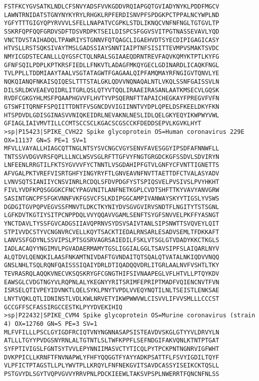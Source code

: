 \begin{lstlisting}
FSTFKCYGVSATKLNDLCFSNVYADSFVVKGDDVRQIAPGQTGVIADYNYKLPDDFMGCV
LAWNTRNIDATSTGNYNYKYRYLRHGKLRPFERDISNVPFSPDGKPCTPPALNCYWPLND
YGFYTTTGIGYQPYRVVVLSFELLNAPATVCGPKLSTDLIKNQCVNFNFNGLTGTGVLTP
SSKRFQPFQQFGRDVSDFTDSVRDPKTSEILDISPCSFGGVSVITPGTNASSEVAVLYQD
VNCTDVSTAIHADQLTPAWRIYSTGNNVFQTQAGCLIGAEHVDTSYECDIPIGAGICASY
HTVSLLRSTSQKSIVAYTMSLGADSSIAYSNNTIAIPTNFSISITTEVMPVSMAKTSVDC
NMYICGDSTECANLLLQYGSFCTQLNRALSGIAAEQDRNTREVFAQVKQMYKTPTLKYFG
GFNFSQILPDPLKPTKRSFIEDLLFNKVTLADAGFMKQYGECLGDINARDLICAQKFNGL
TVLPPLLTDDMIAAYTAALVSGTATAGWTFGAGAALQIPFAMQMAYRFNGIGVTQNVLYE
NQKQIANQFNKAISQIQESLTTTSTALGKLQDVVNQNAQALNTLVKQLSSNFGAISSVLN
DILSRLDKVEAEVQIDRLITGRLQSLQTYVTQQLIRAAEIRASANLAATKMSECVLGQSK
RVDFCGKGYHLMSFPQAAPHGVVFLHVTYVPSQERNFTTAPAICHEGKAYFPREGVFVFN
GTSWFITQRNFFSPQIITTDNTFVSGNCDVVIGIINNTVYDPLQPELDSFKEELDKYFKN
HTSPDVDLGDISGINASVVNIQKEIDRLNEVAKNLNESLIDLQELGKYEQYIKWPWYVWL
GFIAGLIAIVMVTILLCCMTSCCSCLKGACSCGSCCKFDEDDSEPVLKGVKLHYT
>sp|P15423|SPIKE_CVH22 Spike glycoprotein OS=Human coronavirus 229E OX=11137 GN=S PE=1 SV=1
MFVLLVAYALLHIAGCQTTNGLNTSYSVCNGCVGYSENVFAVESGGYIPSDFAFNNWFLL
TNTSSVVDGVVRSFQPLLLNCLWSVSGLRFTTGFVYFNGTGRGDCKGFSSDVLSDVIRYN
LNFEENLRRGTILFKTSYGVVVFYCTNNTLVSGDAHIPFGTVLGNFYCFVNTTIGNETTS
AFVGALPKTVREFVISRTGHFYINGYRYFTLGNVEAVNFNVTTAETTDFCTVALASYADV
LVNVSQTSIANIIYCNSVINRLRCDQLSFDVPDGFYSTSPIQSVELPVSIVSLPVYHKHT
FIVLYVDFKPQSGGGKCFNCYPAGVNITLANFNETKGPLCVDTSHFTTKYVAVYANVGRW
SASINTGNCPFSFGKVNNFVKFGSVCFSLKDIPGGCAMPIVANWAYSKYYTIGSLYVSWS
DGDGITGVPQPVEGVSSFMNVTLDKCTKYNIYDVSGVGVIRVSNDTFLNGITYTSTSGNL
LGFKDVTKGTIYSITPCNPPDQLVVYQQAVVGAMLSENFTSYGFSNVVELPKFFYASNGT
YNCTDAVLTYSSFGVCADGSIIAVQPRNVSYDSVSAIVTANLSIPSNWTTSVQVEYLQIT
STPIVVDCSTYVCNGNVRCVELLKQYTSACKTIEDALRNSARLESADVSEMLTFDKKAFT
LANVSSFGDYNLSSVIPSLPTSGSRVAGRSAIEDILFSKLVTSGLGTVDADYKKCTKGLS
IADLACAQYYNGIMVLPGVADAERMAMYTGSLIGGIALGGLTSAVSIPFSLAIQARLNYV
ALQTDVLQENQKILAASFNKAMTNIVDAFTGVNDAITQTSQALQTVATALNKIQDVVNQQ
GNSLNHLTSQLRQNFQAISSSIQAIYDRLDTIQADQQVDRLITGRLAALNVFVSHTLTKY
TEVRASRQLAQQKVNECVKSQSKRYGFCGNGTHIFSIVNAAPEGLVFLHTVLLPTQYKDV
EAWSGLCVDGTNGYVLRQPNLALYKEGNYYRITSRIMFEPRIPTMADFVQIENCNVTFVN
ISRSELQTIVPEYIDVNKTLQELSYKLPNYTVPDLVVEQYNQTILNLTSEISTLENKSAE
LNYTVQKLQTLIDNINSTLVDLKWLNRVETYIKWPWWVWLCISVVLIFVVSMLLLCCCST
GCCGFFSCFASSIRGCCESTKLPYYDVEKIHIQ
>sp|P22432|SPIKE_CVM4 Spike glycoprotein OS=Murine coronavirus (strain 4) OX=12760 GN=S PE=3 SV=1
MLFVFILLLPSCLGYIGDFRCIQTVNYNGNNASAPSISTEAVDVSKGLGTYYVLDRVYLN
ATLLLTGYYPVDGSNYRNLALTGTNTLSLTWFKPPFLSEFNDGIFAKVQNLKTNTPTGAT
SYFPTIVIGSLFGNTSYTVVLEPYNNIIMASVCTYTICQLPYTPCKPNTNGNRVIGFWHT
DVKPPICLLKRNFTFNVNAPWLYFHFYQQGGTFYAYYADKPSATTFLFSVYIGDILTQYF
VLPFICTPTAGSTLLPLYWVTPLLKRQYLFNFNEKGVITSAVDCASSYISEIKCKTQSLL
PSTGVYDLSGYTVQPVGVVYRRVPNLPDCKIEEWLTAKSVPSPLNWERRTFQNCNFNLSS

\end{lstlisting}
